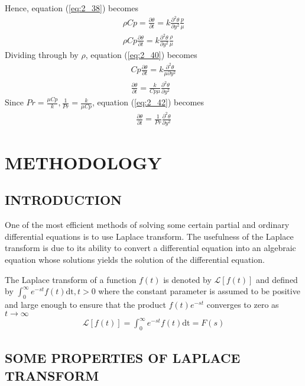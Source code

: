 \documentclass[11pt]{report}
\newcommand{\sps}{\\[0.2cm]}
\newcommand{\refn}[1]{(\ref{#1})}
\newcommand{\refx}[1]{\refn{eq:#1}}
\newcommand{\NI}{\noindent}
\newcommand{\dsp}{\displaystyle}
\newcommand{\Laplace}{\mathcal{L}}
\newcommand{\ft}{f(t)}
\newcommand{\Fs}{F(s)}
\newcommand{\LaplaceIntegral}{\int_{0}^{\infty}e^{-st}\ft\text{dt}}
\newcommand{\sbracket}[1]{\left[#1\right]}
\newcommand{\LFt}{\Laplace \sbracket{\ft}}
\begin{document}
	Hence, equation \refx{2_38} becomes
	\begin{eqnarray}
		\rho Cp =\frac{\partial\theta}{\partial t} = k\frac{\partial^2 \theta}{\partial y^2}\frac{p}{\mu}\sps
		\rho Cp\frac{\partial\theta}{\partial t} = k\frac{\partial^2 \theta}{\partial y^2}\frac{\rho}{\mu}\label{eq:2_40}
	\end{eqnarray}
	Dividing through by $\rho$, equation \refx{2_40} becomes
	\begin{eqnarray}
			Cp\frac{\partial\theta}{\partial t} = k\frac{\partial^2 \theta}{\mu\partial y^2}\sps
			\frac{\partial\theta}{\partial t} = \frac{k}{Cp \mu}\frac{\partial^2 \theta}{\partial y^2}\label{eq:2_42}
	\end{eqnarray}
	Since $\dsp Pr = \frac{\mu Cp}{k}, \frac{1}{Pr} = \frac{k}{\mu Cp}$, equation \refx{2_42} becomes
	\begin{eqnarray}
		\frac{\partial\theta}{\partial t} = \frac{1}{Pr}\frac{\partial^2 \theta}{\partial y^2}\label{eq:2_43}
	\end{eqnarray}
	
	
	\chapter{METHODOLOGY}
	\section{INTRODUCTION}
	One of the most efficient methods of solving some certain partial and ordinary differential equations is to use Laplace transform. The usefulness of the Laplace transform is due to its ability to convert a differential equation into an algebraic equation whose solutions yields the solution of the differential equation.
	
	\NI The Laplace transform of a function $\ft$ is denoted by $\LFt$ and defined by $\dsp \LaplaceIntegral, t > 0$ where the constant parameter is assumed to be positive and large enough to ensure that the product $\ft e^{-st}$ converges to zero as $t\rightarrow\infty$
	\begin{eqnarray}
		\LFt = \LaplaceIntegral = \Fs\label{eq:3_1}
	\end{eqnarray}
	
	\section{SOME PROPERTIES OF LAPLACE TRANSFORM}
\end{document}
